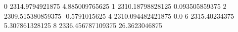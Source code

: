 0 2314.9794921875 4.885009765625
1 2310.18798828125 0.093505859375
2 2309.515380859375 -0.5791015625
4 2310.094482421875 0.0
6 2315.40234375 5.307861328125
8 2336.456787109375 26.3623046875
